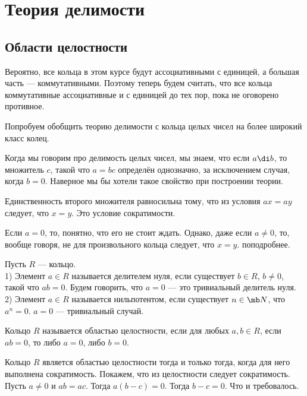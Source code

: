 \chapter{Теория делимости}

\section{Области целостности}

\rm Вероятно, все кольца в этом курсе будут ассоциативными с единицей, а большая часть --- коммутативными. Поэтому теперь будем считать, что все кольца коммутативные ассоциативные и с единицей до тех пор, пока не оговорено противное.
\erm

Попробуем обобщить теорию делимости с кольца целых чисел на более широкий класс колец.

Когда мы говорим про делимость целых чисел, мы знаем, что если $a\di b$, то множитель $c$, такой что $a=bc$ определён однозначно, за исключением случая, когда $b=0$. Наверное мы бы хотели такое свойство при построении теории. 

Единственность второго множителя равносильна тому, что из условия $ax=ay$ следует, что $x=y$. Это условие сократимости.

Если $a=0$, то, понятно, что его не стоит ждать. Однако, даже если $a\neq 0$, то, вообще говоря, не для произвольного кольца  следует, что $x=y$. поподробнее.

 Пусть $R$ --- кольцо.\\
1) Элемент $a\in R$ называется делителем нуля, если существует $b\in R$, $b\neq 0$, такой что $ab=0$. Будем говорить, что
$a=0$ --- это тривиальный делитель нуля.\\
2) Элемент $a\in R$ называется нильпотентом, если существует $n\in \mb N$, что $a^n= 0$. $a= 0$ --- тривиальный случай.
\edfn

 Кольцо $R$ называется областью целостности, если для любых $a,b\in R$,
если $ab=0$, то либо $a = 0$, либо $b= 0$.
\edfn

\lm Кольцо $R$ является областью целостности тогда и только тогда, когда для него выполнена сократимость.
\proof Покажем, что из целостности следует сократимость. Пусть $a\neq 0$ и $ab=ac$. Тогда $a(b-c)=0$. Тогда $b-c=0$. Что и требовалось.
\endproof
\elm


